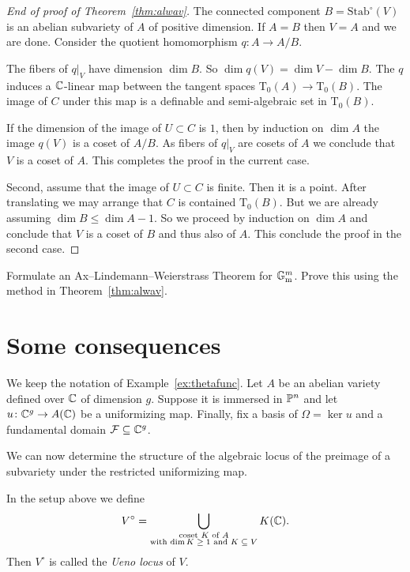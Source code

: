 \begin{proof}[End of proof of Theorem~\ref{thm:alwav}]
  The connected component $B = \mathrm{Stab}^\circ(V)$ is an abelian
  subvariety of $A$ of positive dimension.
  If $A=B$ then $V=A$ and we are done. 
  Consider the quotient homomorphism $q\colon A\rightarrow A/B$.

  The fibers of $q|_V$ have dimension $\dim B$. So $\dim q(V) = \dim
  V-\dim B$. The $q$ induces a ${\mathbb{C}}$-linear map between the tangent
  spaces $\mathrm{T}_0(A)\rightarrow\mathrm{T}_0(B)$. The image of $C$
  under this map is a definable and semi-algebraic set in
  $\mathrm{T}_0(B)$.

  If the dimension of the image of $U\subset C$ is $1$, then by induction on
  $\dim A$ the image $q(V)$ is a coset
  of $A/B$. As fibers of $q|_V$ are  cosets
  of $A$ we conclude that $V$ is a coset of $A$. This completes the proof in the current
  case.

  Second, assume that the image of $U\subset C$ is finite. Then it is
  a point. After translating we may arrange that $C$ is contained
  $\mathrm{T}_0(B)$. But we are already assuming $\dim B \le \dim
  A-1$. 
  So we proceed by induction on $\dim A$ and conclude that $V$ is a
  coset of $B$ and thus also of $A$. This
  conclude the proof in the second case.
\end{proof}

\begin{exercise}
  Formulate an Ax--Lindemann--Weierstrass Theorem for
  ${\mathbb{G}}_{\mathrm{m}}^m$. Prove this using the method in Theorem~\ref{thm:alwav}.  
\end{exercise}

\section{Some consequences}
\label{sec:conclusionft}

We keep the notation of Example~\ref{ex:thetafunc}. 
Let $A$ be an abelian variety defined over ${\mathbb{C}}$ of dimension $g$. Suppose it is
immersed in ${\mathbb{P}}^n$ and let $u\colon {\mathbb{C}}^{g}\rightarrow A({\mathbb{C}})$ be a
uniformizing map. Finally, fix a basis of $\Omega = \ker u$ and a
fundamental domain ${\mathcal F} \subseteq{\mathbb{C}}^g$.

We can now determine the structure of the algebraic locus of the
preimage of a subvariety under the restricted uniformizing map. 

\begin{definition}
  \label{def:ueno}
  In the setup above we define
  \begin{equation*}
    V^{\circ} = \bigcup_{\substack{\text{coset $K$ of $A$} \\\text{with $\dim
          K\ge 1$ and $K\subseteq
          V$}}} K({\mathbb{C}}).
  \end{equation*}
  Then $V^{\circ}$ is called the \emph{Ueno locus} of $V$. 
\end{definition}

